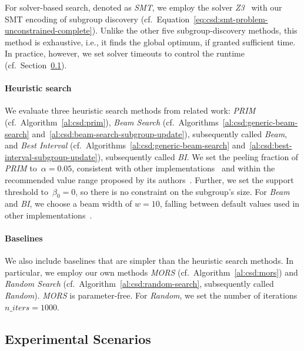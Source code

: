 \documentclass{article}
\theoremstyle{definition}
\begin{document}
For solver-based search, denoted as \emph{SMT}, we employ the solver \emph{Z3}~\cite{bjorner2015nuz, deMoura2008z3} with our SMT encoding of subgroup discovery (cf.~Equation~\ref{eq:csd:smt-problem-unconstrained-complete}).
Unlike the other five subgroup-discovery methods, this method is exhaustive, i.e., it finds the global optimum, if granted sufficient time.
In practice, however, we set solver timeouts to control the runtime (cf.~Section~\ref{sec:csd:experimental-design:scenarios}).

\paragraph{Heuristic search}

We evaluate three heuristic search methods from related work:
\emph{PRIM} (cf.~Algorithm~\ref{al:csd:prim}), \emph{Beam Search} (cf.~Algorithms~\ref{al:csd:generic-beam-search} and~\ref{al:csd:beam-search-subgroup-update}), subsequently called \emph{Beam}, and \emph{Best Interval} (cf.~Algorithms~\ref{al:csd:generic-beam-search} and~\ref{al:csd:best-interval-subgroup-update}), subsequently called \emph{BI}.
We set the peeling fraction of \emph{PRIM} to~$\alpha = 0.05$, consistent with other implementations~\cite{arzamasov2021reds, kwakkel2017exploratory} and within the recommended value range proposed by its authors~\cite{friedman1999bump}.
Further, we set the support threshold to~$\beta_0 = 0$, so there is no constraint on the subgroup's size.
For \emph{Beam} and \emph{BI}, we choose a beam width of $w=10$, falling between default values used in other implementations~\cite{arzamasov2021reds, lemmerich2019pysubgroup}.

\paragraph{Baselines}

We also include baselines that are simpler than the heuristic search methods.
In particular, we employ our own methods \emph{MORS} (cf.~Algorithm~\ref{al:csd:mors}) and \emph{Random Search} (cf.~Algorithm~\ref{al:csd:random-search}, subsequently called \emph{Random}).
\emph{MORS} is parameter-free.
For \emph{Random}, we set the number of iterations $\mathit{n\_iters} = 1000$.

\subsection{Experimental Scenarios}
\label{sec:csd:experimental-design:scenarios}
\end{document}

